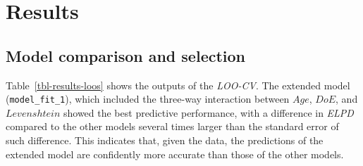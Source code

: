 \documentclass[
  letterpaper,
  DIV=11,
  numbers=noendperiod]{scrartcl}
\begin{document}
\hypertarget{results}{%
\section{Results}\label{results}}

\hypertarget{comparison}{%
\subsection{Model comparison and selection}\label{comparison}}

Table~\ref{tbl-results-loos} shows the outputs of the \emph{LOO-CV}. The
extended model (\texttt{model\_fit\_1}), which included the three-way
interaction between \(Age\), \(DoE\), and \(Levenshtein\) showed the
best predictive performance, with a difference in \emph{ELPD} compared
to the other models several times larger than the standard error of such
difference. This indicates that, given the data, the predictions of the
extended model are confidently more accurate than those of the other
models.
\end{document}
